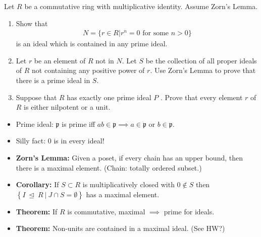 Let \(R\) be a commutative ring with multiplicative identity. Assume
Zorn's Lemma.

\begin{enumerate}
\def\labelenumi{\alph{enumi}.}
\item
  Show that
  \begin{align*}
  N = \{r \in R \mathrel{\Big|}r^n = 0 \text{ for some } n > 0\}
  \end{align*}
  is an ideal which is contained in any prime ideal.
\item
  Let \(r\) be an element of \(R\) not in \(N\). Let \(S\) be the
  collection of all proper ideals of \(R\) not containing any positive
  power of \(r\). Use Zorn's Lemma to prove that there is a prime ideal
  in \(S\).
\item
  Suppose that \(R\) has exactly one prime ideal \(P\) . Prove that
  every element \(r\) of \(R\) is either nilpotent or a unit.
\end{enumerate}

\begin{concept}

\envlist

\begin{itemize}
\item
  Prime ideal: \(\mathfrak{p}\) is prime iff
  \(ab \in \mathfrak{p} \implies a\in \mathfrak{p}\) or
  \(b\in \mathfrak{p}\).
\item
  Silly fact: 0 is in every ideal!
\item
  \textbf{Zorn's Lemma:} Given a poset, if every chain has an upper
  bound, then there is a maximal element. (Chain: totally ordered
  subset.)
\item
  \textbf{Corollary:} If \(S\subset R\) is multiplicatively closed with
  \(0\not\in S\) then
  \(\left\{{I {~\trianglelefteq~}R {~\mathrel{\Big|}~}J\cap S = \emptyset}\right\}\)
  has a maximal element.

\item
  \textbf{Theorem:} If \(R\) is commutative, maximal \(\implies\) prime
  for ideals.

\item
  \textbf{Theorem:} Non-units are contained in a maximal ideal. (See
  HW?)
\end{itemize}

\end{concept}

